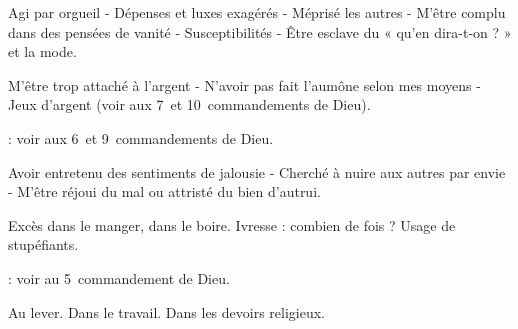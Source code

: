 

Agi par orgueil - Dépenses et luxes exagérés - Méprisé les autres - M’être complu
dans des pensées de vanité - Susceptibilités - Être esclave du « qu’en dira-t-on ? »
et la mode.


M’être trop attaché à l’argent - N’avoir
pas fait l’aumône selon mes moyens - Jeux
d’argent (voir aux 7\ieme\ et 10\ieme\ commandements
de Dieu).

 : voir aux 6\ieme\ et 9\ieme\ commandements de Dieu.


Avoir entretenu des sentiments de jalousie - Cherché à nuire aux autres par envie
- M’être réjoui du mal ou attristé du bien
d’autrui.


Excès dans le manger, dans le boire.
Ivresse : combien de fois ? Usage de stupéfiants.

 : voir au 5\ieme\ commandement de Dieu.


Au lever. Dans le travail. Dans les devoirs religieux.


